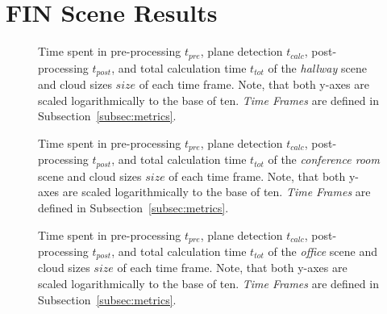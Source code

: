 \documentclass[main.tex]{subfiles}
\begin{document}
\appendix
\chapter{FIN Scene Results}
\label{app:fin}

\begin{figure}[H]
    \centering
    \def\svgwidth{0.9\textwidth}
    
    \caption[Time Results Hallway]{Time spent in pre-processing $t_{pre}$, plane detection $t_{calc}$, post-processing
        $t_{post}$, and total calculation time $t_{tot}$ of the \textit{hallway} scene and cloud sizes $size$ of each time frame.
        Note, that both y-axes are scaled logarithmically to the base of ten. \textit{Time Frames} are defined in Subsection~\ref{subsec:metrics}.}
    \label{fig:dynhallway}
\end{figure}

\begin{figure}[H]
    \centering
    \def\svgwidth{0.9\textwidth}
    
    \caption[Time Results Conference Room]{Time spent in pre-processing $t_{pre}$, plane detection $t_{calc}$, post-processing
        $t_{post}$, and total calculation time $t_{tot}$ of the \textit{conference room} scene and cloud sizes $size$ of each time frame.
        Note, that both y-axes are scaled logarithmically to the base of ten. \textit{Time Frames} are defined in Subsection~\ref{subsec:metrics}.}
    \label{fig:dynconf}
\end{figure}

\begin{figure}[H]
    \centering
    \def\svgwidth{0.9\textwidth}
    
    \caption[Time Results Office]{Time spent in pre-processing $t_{pre}$, plane detection $t_{calc}$, post-processing
        $t_{post}$, and total calculation time $t_{tot}$ of the \textit{office} scene and cloud sizes $size$ of each time frame.
        Note, that both y-axes are scaled logarithmically to the base of ten. \textit{Time Frames} are defined in Subsection~\ref{subsec:metrics}.}
    \label{fig:dynoff}
\end{figure}
\end{document}
